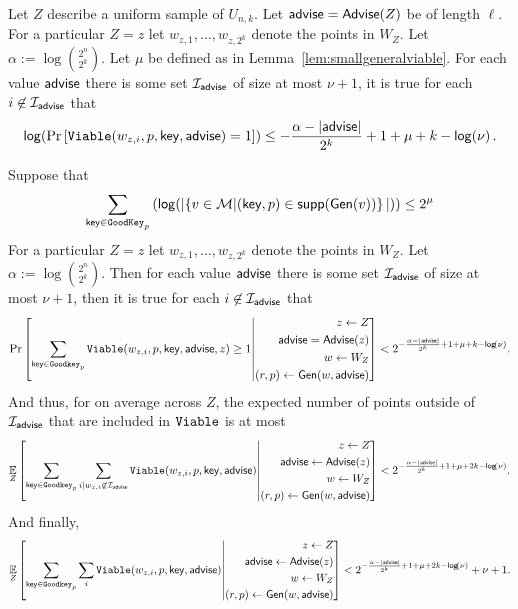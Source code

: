 \begin{lemma}
Let $Z$ describe a uniform sample of $U_{n,k}$.  Let ${\mathsf{advise}} = {\mathsf{Advise}}(Z)$ be of length $\ell$.
 For a particular $Z=z$ let $w_{z,1},..., w_{z,2^k}$ denote the points in $W_Z$. Let $\alpha:= \log {2^n\choose 2^k}$.  Let $\mu$ be defined as in Lemma~\ref{lem:smallgeneralviable}.  
For each value ${\mathsf{advise}}$ there is some set $\mathcal{I}_{{\mathsf{advise}}}$ of size at most $\nu+1$, it is true for each $i\not \in \mathcal{I}_{\mathsf{advise}}$ that
\[
\mathsf{log}\!\left(\Pr\left[\mathtt{Viable}(w_{z,i}, p, \mathsf{key}, {\mathsf{advise}}) = 1 \right]\right)\le -\frac{\alpha -|{\mathsf{advise}}| }{2^k}+1+\mu+k-\mathsf{log}\!\left(\nu\right).
\]
\label{lem:entr of members}
\end{lemma}

\begin{corollary}
\label{corollary:info loss}
Suppose that 
\[
   \sum_{\mathsf{key}\in \mathtt{GoodKey}_p} \left( \mathsf{log}\!\left(|\!\left\{ v \in \mathcal{M}|\!\left(\mathsf{key}, p\right) \in \mathsf{supp}\!\left(\mathsf{Gen}(v)\right) \right\}|\right)\right) \le 2^\mu 
 \]
 For a particular $Z=z$ let $w_{z,1},..., w_{z,2^k}$ denote the points in $W_Z$. Let $\alpha:= \log {2^n\choose 2^k}$.  
 Then for each value ${\mathsf{advise}}$ there is some set $\mathcal{I}_{{\mathsf{advise}}}$ of size at most $\nu+1$, then it is true for each $i\not \in \mathcal{I}_{\mathsf{advise}}$ that
\[
\Pr\left[\sum_{\mathsf{key} \in \mathtt{Goodkey}_p} \mathtt{Viable}(w_{z,i}, p, \mathsf{key}, {\mathsf{advise}}, z) \ge 1\middle| \begin{aligned} z\leftarrow Z\\ {\mathsf{advise}}= {\mathsf{Advise}}(z)\\w\leftarrow W_Z\\(r, p)\leftarrow {\ensuremath{\mathsf{Gen}}}(w, {\mathsf{advise}}) \end{aligned} \right]< 2^{-\frac{\alpha-|{\mathsf{advise}}|}{2^k}+1+\mu+k-\mathsf{log}\!\left(\nu\right) }.
\]
And thus, for on average across $Z$, the expected number of points outside of $\mathcal{I}_{\mathsf{advise}}$ that are included in $\mathtt{Viable}$ is at most 
\begin{align*}
\operatorname*{\mathbb{E}}_{Z} \left[\sum_{\mathsf{key} \in \mathtt{Goodkey}_p}\sum_{i | w_{z,i}\not\in\mathcal{I}_{\mathsf{advise}}} \mathtt{Viable}(w_{z,i}, p, \mathsf{key}, {\mathsf{advise}}) \middle| \begin{aligned} z\leftarrow Z\\ {\mathsf{advise}}\leftarrow {\ensuremath{\mathsf{Advise}}}(z)\\w\leftarrow W_Z\\(r, p)\leftarrow {\ensuremath{\mathsf{Gen}}}(w, {\mathsf{advise}})\end{aligned} \right]< 2^{-\frac{\alpha - |{\mathsf{advise}}|}{2^k}+1+\mu+2k-\mathsf{log}\!\left(\nu\right)}.
\end{align*}
And finally, 
\begin{align*}
\operatorname*{\mathbb{E}}_{Z} \left[\sum_{\mathsf{key} \in \mathtt{Goodkey}_p}\sum_{i }  \mathtt{Viable}(w_{z,i}, p, \mathsf{key}, {\mathsf{advise}}) \middle| \begin{aligned} z\leftarrow Z\\ {\mathsf{advise}}\leftarrow {\ensuremath{\mathsf{Advise}}}(z)\\w\leftarrow W_Z\\(r, p)\leftarrow {\ensuremath{\mathsf{Gen}}}(w, {\mathsf{advise}})\end{aligned} \right]< 2^{-\frac{\alpha-|{\mathsf{advise}}|}{2^k}+1+\mu+2k-\mathsf{log}\!\left(\nu\right)}+\nu+1.
\end{align*}

\end{corollary}

